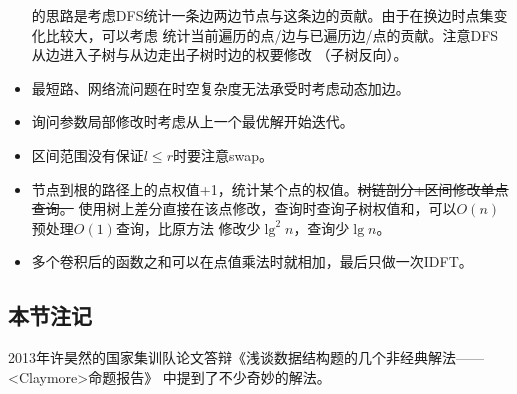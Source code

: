 \begin{itemize}
	      的思路是考虑DFS统计一条边两边节点与这条边的贡献。由于在换边时点集变化比较大，可以考虑
	      统计当前遍历的点/边与已遍历边/点的贡献。注意DFS从边进入子树与从边走出子树时边的权要修改
	      （子树反向）。
	\item 最短路、网络流问题在时空复杂度无法承受时考虑动态加边。
	\item 询问参数局部修改时考虑从上一个最优解开始迭代。
	\item 区间范围没有保证$l\leq r$时要注意swap。
	\item 节点到根的路径上的点权值+1，统计某个点的权值。\sout{树链剖分+区间修改单点查询。}
	使用树上差分直接在该点修改，查询时查询子树权值和，可以$O(n)$预处理$O(1)$查询，比原方法
	修改少$\lg^2 n$，查询少$\lg n$。
	\item 多个卷积后的函数之和可以在点值乘法时就相加，最后只做一次IDFT。
\end{itemize}
\subsection{本节注记}
2013年许昊然的国家集训队论文答辩《浅谈数据结构题的几个非经典解法——<Claymore>命题报告》
中提到了不少奇妙的解法。
